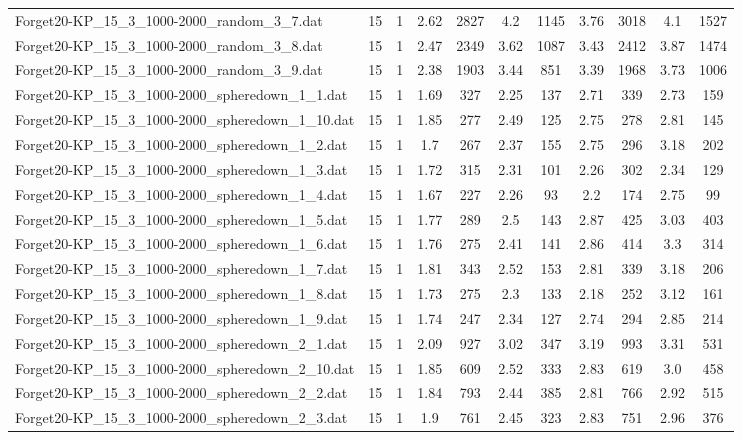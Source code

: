 \begin{table}[!ht]
\begin{tabular}{lcccccccccc}
Forget20-KP\_15\_3\_1000-2000\_random\_3\_7.dat & 15 & 1 & 2.62 & 2827 & 4.2 & 1145 & 3.76 & 3018 & 4.1 & 1527 \\
Forget20-KP\_15\_3\_1000-2000\_random\_3\_8.dat & 15 & 1 & 2.47 & 2349 & 3.62 & 1087 & 3.43 & 2412 & 3.87 & 1474 \\
Forget20-KP\_15\_3\_1000-2000\_random\_3\_9.dat & 15 & 1 & 2.38 & 1903 & 3.44 & 851 & 3.39 & 1968 & 3.73 & 1006 \\
Forget20-KP\_15\_3\_1000-2000\_spheredown\_1\_1.dat & 15 & 1 & 1.69 & 327 & 2.25 & 137 & 2.71 & 339 & 2.73 & 159 \\
Forget20-KP\_15\_3\_1000-2000\_spheredown\_1\_10.dat & 15 & 1 & 1.85 & 277 & 2.49 & 125 & 2.75 & 278 & 2.81 & 145 \\
Forget20-KP\_15\_3\_1000-2000\_spheredown\_1\_2.dat & 15 & 1 & 1.7 & 267 & 2.37 & 155 & 2.75 & 296 & 3.18 & 202 \\
Forget20-KP\_15\_3\_1000-2000\_spheredown\_1\_3.dat & 15 & 1 & 1.72 & 315 & 2.31 & 101 & 2.26 & 302 & 2.34 & 129 \\
Forget20-KP\_15\_3\_1000-2000\_spheredown\_1\_4.dat & 15 & 1 & 1.67 & 227 & 2.26 & 93 & 2.2 & 174 & 2.75 & 99 \\
Forget20-KP\_15\_3\_1000-2000\_spheredown\_1\_5.dat & 15 & 1 & 1.77 & 289 & 2.5 & 143 & 2.87 & 425 & 3.03 & 403 \\
Forget20-KP\_15\_3\_1000-2000\_spheredown\_1\_6.dat & 15 & 1 & 1.76 & 275 & 2.41 & 141 & 2.86 & 414 & 3.3 & 314 \\
Forget20-KP\_15\_3\_1000-2000\_spheredown\_1\_7.dat & 15 & 1 & 1.81 & 343 & 2.52 & 153 & 2.81 & 339 & 3.18 & 206 \\
Forget20-KP\_15\_3\_1000-2000\_spheredown\_1\_8.dat & 15 & 1 & 1.73 & 275 & 2.3 & 133 & 2.18 & 252 & 3.12 & 161 \\
Forget20-KP\_15\_3\_1000-2000\_spheredown\_1\_9.dat & 15 & 1 & 1.74 & 247 & 2.34 & 127 & 2.74 & 294 & 2.85 & 214 \\
Forget20-KP\_15\_3\_1000-2000\_spheredown\_2\_1.dat & 15 & 1 & 2.09 & 927 & 3.02 & 347 & 3.19 & 993 & 3.31 & 531 \\
Forget20-KP\_15\_3\_1000-2000\_spheredown\_2\_10.dat & 15 & 1 & 1.85 & 609 & 2.52 & 333 & 2.83 & 619 & 3.0 & 458 \\
Forget20-KP\_15\_3\_1000-2000\_spheredown\_2\_2.dat & 15 & 1 & 1.84 & 793 & 2.44 & 385 & 2.81 & 766 & 2.92 & 515 \\
Forget20-KP\_15\_3\_1000-2000\_spheredown\_2\_3.dat & 15 & 1 & 1.9 & 761 & 2.45 & 323 & 2.83 & 751 & 2.96 & 376 \\

\end{tabular}
\end{table}
